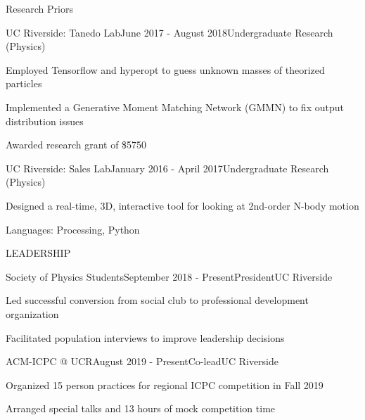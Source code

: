 \documentclass{resume} %
\begin{document}
\begin{rSection}{Research Priors}

\begin{rSubsection}{UC Riverside: Tanedo Lab}{June 2017 - August 2018}{Undergraduate Research (Physics)}{}
\item Employed Tensorflow and hyperopt to guess unknown masses of theorized particles
\item Implemented a Generative Moment Matching Network (GMMN) to fix output distribution issues
\item Awarded research grant of \$5750
\end{rSubsection}



\begin{rSubsection}{UC Riverside: Sales Lab}{January 2016 - April 2017}{Undergraduate Research (Physics)}{}
\item Designed a real-time, 3D, interactive tool for looking at 2nd-order N-body motion
\item Languages: Processing, Python
\end{rSubsection}

\end{rSection}



\begin{rSection}{LEADERSHIP}

\begin{rSubsection}{Society of Physics Students}{September 2018 - Present}{President}{UC Riverside}
\item Led successful conversion from social club to professional development organization
\item Facilitated population interviews to improve leadership decisions
\end{rSubsection}


\begin{rSubsection}{ACM-ICPC @ UCR}{August 2019 - Present}{Co-lead}{UC Riverside}
\item Organized 15 person practices for regional ICPC competition in Fall 2019
\item Arranged special talks and 13 hours of mock competition time
\end{rSubsection}



\end{rSection}
\end{document}
